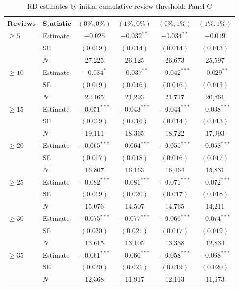 \begin{table}[!htbp]
\centering
\caption{RD estimates by initial cumulative review threshold: Panel C}
\label{tab:review_threshold_5to40_panel_c}
\small
\begin{tabular}{llcccc}
\toprule
Reviews & Statistic & $(0\%,0\%)$ & $(1\%,0\%)$ & $(0\%,1\%)$ & $(1\%,1\%)$ \\
\midrule
$\geq 5$ & Estimate & $-0.025$ & $-0.032^{**}$ & $-0.034^{**}$ & $-0.019$ \\
 & SE & $(0.019)$ & $(0.014)$ & $(0.014)$ & $(0.013)$ \\
 & $N$ & 27,225 & 26,125 & 26,673 & 25,597 \\
\addlinespace
$\geq 10$ & Estimate & $-0.034^{*}$ & $-0.037^{**}$ & $-0.042^{***}$ & $-0.029^{**}$ \\
 & SE & $(0.019)$ & $(0.016)$ & $(0.016)$ & $(0.013)$ \\
 & $N$ & 22,165 & 21,293 & 21,717 & 20,861 \\
\addlinespace
$\geq 15$ & Estimate & $-0.051^{***}$ & $-0.043^{***}$ & $-0.044^{***}$ & $-0.038^{***}$ \\
 & SE & $(0.019)$ & $(0.016)$ & $(0.014)$ & $(0.013)$ \\
 & $N$ & 19,111 & 18,365 & 18,722 & 17,993 \\
\addlinespace
$\geq 20$ & Estimate & $-0.065^{***}$ & $-0.064^{***}$ & $-0.055^{***}$ & $-0.058^{***}$ \\
 & SE & $(0.017)$ & $(0.018)$ & $(0.016)$ & $(0.017)$ \\
 & $N$ & 16,807 & 16,163 & 16,464 & 15,831 \\
\addlinespace
$\geq 25$ & Estimate & $-0.082^{***}$ & $-0.081^{***}$ & $-0.071^{***}$ & $-0.072^{***}$ \\
 & SE & $(0.019)$ & $(0.020)$ & $(0.017)$ & $(0.018)$ \\
 & $N$ & 15,076 & 14,507 & 14,765 & 14,211 \\
\addlinespace
$\geq 30$ & Estimate & $-0.075^{***}$ & $-0.077^{***}$ & $-0.066^{***}$ & $-0.074^{***}$ \\
 & SE & $(0.020)$ & $(0.021)$ & $(0.017)$ & $(0.019)$ \\
 & $N$ & 13,615 & 13,105 & 13,338 & 12,834 \\
\addlinespace
$\geq 35$ & Estimate & $-0.061^{***}$ & $-0.066^{***}$ & $-0.058^{***}$ & $-0.068^{***}$ \\
 & SE & $(0.020)$ & $(0.021)$ & $(0.019)$ & $(0.020)$ \\
 & $N$ & 12,368 & 11,917 & 12,113 & 11,673 \\

\end{tabular}
\end{table}
